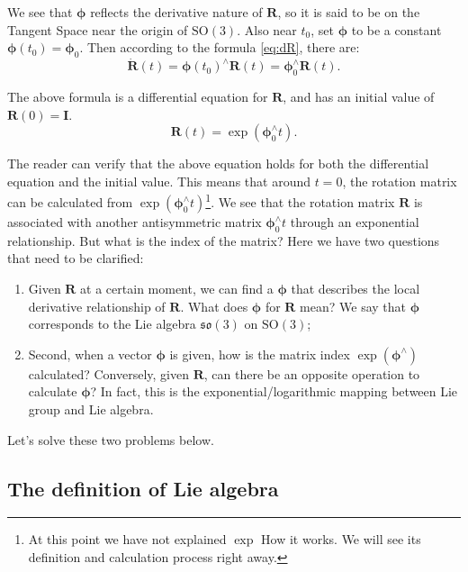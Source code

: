       We see that $\boldsymbol{\phi}$ reflects the derivative nature of $\bm{R}$, so it is said to be on the Tangent Space near the origin of $\mathrm{SO}(3)$. Also near $t_0$, set $\boldsymbol{\phi}$ to be a constant $\boldsymbol{\phi}(t_0) = \boldsymbol{\phi}_0$. Then according to the formula \eqref{eq:dR}, there are:
      \[
        \bm{ \dot{R} } (t) = \boldsymbol{\phi} (t_0) ^ {\wedge} \bm{R}(t) = \boldsymbol{\phi}_0^ {\wedge} \bm {R}(t).
        \]

        The above formula is a differential equation for $\bm{R}$, and has an initial value of $\bm{R}(0) = \bm{I}$.
        \begin{equation}
        \label{eq:so3ode}
        \bm{R}(t) = \exp \left( \boldsymbol{\phi}_0^\wedge t \right).
        \end{equation}

        The reader can verify that the above equation holds for both the differential equation and the initial value. This means that around $t = 0$, the rotation matrix can be calculated from $\exp \left( \boldsymbol{\phi}_0^\wedge t \right)$\footnote{At this point we have not explained $\exp$ How it works. We will see its definition and calculation process right away. }. We see that the rotation matrix $\bm{R}$ is associated with another antisymmetric matrix $\boldsymbol{\phi}_0^\wedge t$ through an exponential relationship. But what is the index of the matrix? Here we have two questions that need to be clarified:

        \begin{enumerate}
        \item Given $\bm{R}$ at a certain moment, we can find a $\boldsymbol{\phi}$ that describes the local derivative relationship of $\bm{R}$. What does $\boldsymbol{\phi}$ for $\bm{R}$ mean? We say that $\boldsymbol{\phi}$ corresponds to the Lie algebra $\mathfrak{so}(3)$ on $\mathrm{SO}(3)$;
        \item Second, when a vector $\boldsymbol{\phi}$ is given, how is the matrix index $\exp (\boldsymbol{\phi} ^\wedge )$ calculated? Conversely, given $\bm{R}$, can there be an opposite operation to calculate $\boldsymbol{\phi}$? In fact, this is the exponential/logarithmic mapping between Lie group and Lie algebra.
        \end{enumerate}

        Let's solve these two problems below.
        
   \subsection{The definition of Lie algebra}
   
